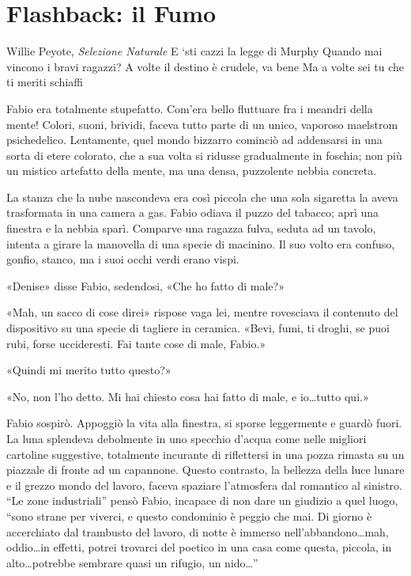 \chapter{Flashback: il Fumo}

\begin{chapquote}{Willie Peyote, \textit{Selezione Naturale}}
	E `sti cazzi la legge di Murphy\newline
	Quando mai vincono i bravi ragazzi?\newline
	A volte il destino è crudele, va bene\newline
	Ma a volte sei tu che ti meriti schiaffi
\end{chapquote}



Fabio era totalmente stupefatto. Com'era bello fluttuare fra i meandri della mente! Colori, suoni, brividi, faceva tutto parte di un unico, vaporoso maelstrom psichedelico. Lentamente, quel mondo bizzarro cominciò ad addensarsi in una sorta di etere colorato, che a sua volta si ridusse gradualmente in foschia; non più un mistico artefatto della mente, ma una densa, puzzolente nebbia concreta.

La stanza che la nube nascondeva era così piccola che una sola sigaretta la aveva trasformata in una camera a gas. Fabio odiava il puzzo del tabacco; aprì una finestra e la nebbia sparì. Comparve una ragazza fulva, seduta ad un tavolo, intenta a girare la manovella di una specie di macinino. Il suo volto era confuso, gonfio, stanco, ma i suoi occhi verdi erano vispi.

«Denise» disse Fabio, sedendosi, «Che ho fatto di male?»

«Mah, un sacco di cose direi» rispose vaga lei, mentre rovesciava il contenuto del dispositivo su una specie di tagliere in ceramica. «Bevi, fumi, ti droghi, se puoi rubi, forse uccideresti. Fai tante cose di male, Fabio.»

«Quindi mi merito tutto questo?»

«No, non l'ho detto. Mi hai chiesto cosa hai fatto di male, e io\ldots \space tutto qui.»

Fabio sospirò. Appoggiò la vita alla finestra, si sporse leggermente e guardò fuori. La luna splendeva debolmente in uno specchio d'acqua come nelle migliori cartoline suggestive, totalmente incurante di riflettersi in una pozza rimasta su un piazzale di fronte ad un capannone. Questo contrasto, la bellezza della luce lunare e il grezzo mondo del lavoro, faceva spaziare l'atmosfera dal romantico al sinistro. ``Le zone industriali'' pensò Fabio, incapace di non dare un giudizio a quel luogo, ``sono strane per viverci, e questo condominio è peggio che mai. Di giorno è accerchiato dal trambusto del lavoro, di notte è immerso nell'abbandono\ldots \space mah, oddio\ldots \space in effetti, potrei trovarci del poetico in una casa come questa, piccola, in alto\ldots \space potrebbe sembrare quasi un rifugio, un nido\ldots''

